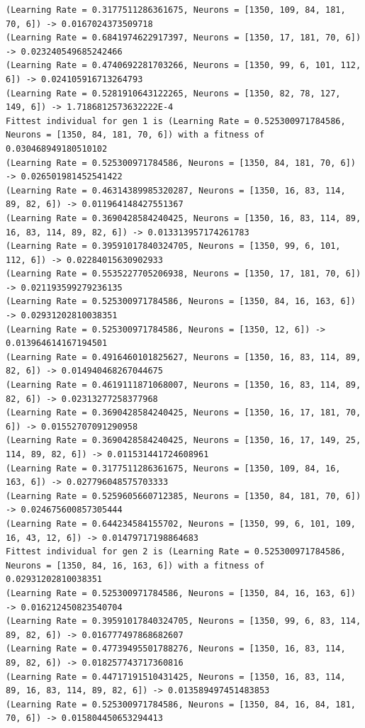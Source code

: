\documentclass{report}
\begin{document}
\begin{verbatim}
(Learning Rate = 0.3177511286361675, Neurons = [1350, 109, 84, 181, 70, 6]) -> 0.0167024373509718
(Learning Rate = 0.6841974622917397, Neurons = [1350, 17, 181, 70, 6]) -> 0.023240549685242466
(Learning Rate = 0.4740692281703266, Neurons = [1350, 99, 6, 101, 112, 6]) -> 0.024105916713264793
(Learning Rate = 0.5281910643122265, Neurons = [1350, 82, 78, 127, 149, 6]) -> 1.7186812573632222E-4
Fittest individual for gen 1 is (Learning Rate = 0.525300971784586, Neurons = [1350, 84, 181, 70, 6]) with a fitness of 0.030468949180510102
(Learning Rate = 0.525300971784586, Neurons = [1350, 84, 181, 70, 6]) -> 0.026501981452541422
(Learning Rate = 0.46314389985320287, Neurons = [1350, 16, 83, 114, 89, 82, 6]) -> 0.011964148427551367
(Learning Rate = 0.3690428584240425, Neurons = [1350, 16, 83, 114, 89, 16, 83, 114, 89, 82, 6]) -> 0.013313957174261783
(Learning Rate = 0.39591017840324705, Neurons = [1350, 99, 6, 101, 112, 6]) -> 0.02284015630902933
(Learning Rate = 0.5535227705206938, Neurons = [1350, 17, 181, 70, 6]) -> 0.021193599279236135
(Learning Rate = 0.525300971784586, Neurons = [1350, 84, 16, 163, 6]) -> 0.02931202810038351
(Learning Rate = 0.525300971784586, Neurons = [1350, 12, 6]) -> 0.013964614167194501
(Learning Rate = 0.4916460101825627, Neurons = [1350, 16, 83, 114, 89, 82, 6]) -> 0.014940468267044675
(Learning Rate = 0.4619111871068007, Neurons = [1350, 16, 83, 114, 89, 82, 6]) -> 0.02313277258377968
(Learning Rate = 0.3690428584240425, Neurons = [1350, 16, 17, 181, 70, 6]) -> 0.01552707091290958
(Learning Rate = 0.3690428584240425, Neurons = [1350, 16, 17, 149, 25, 114, 89, 82, 6]) -> 0.011531441724608961
(Learning Rate = 0.3177511286361675, Neurons = [1350, 109, 84, 16, 163, 6]) -> 0.027796048575703333
(Learning Rate = 0.5259605660712385, Neurons = [1350, 84, 181, 70, 6]) -> 0.024675600857305444
(Learning Rate = 0.644234584155702, Neurons = [1350, 99, 6, 101, 109, 16, 43, 12, 6]) -> 0.01479717198864683
Fittest individual for gen 2 is (Learning Rate = 0.525300971784586, Neurons = [1350, 84, 16, 163, 6]) with a fitness of 0.02931202810038351
(Learning Rate = 0.525300971784586, Neurons = [1350, 84, 16, 163, 6]) -> 0.016212450823540704
(Learning Rate = 0.39591017840324705, Neurons = [1350, 99, 6, 83, 114, 89, 82, 6]) -> 0.016777497868682607
(Learning Rate = 0.47739495501788276, Neurons = [1350, 16, 83, 114, 89, 82, 6]) -> 0.018257743717360816
(Learning Rate = 0.44717191510431425, Neurons = [1350, 16, 83, 114, 89, 16, 83, 114, 89, 82, 6]) -> 0.013589497451483853
(Learning Rate = 0.525300971784586, Neurons = [1350, 84, 16, 84, 181, 70, 6]) -> 0.015804450653294413

\end{verbatim}
\end{document}
